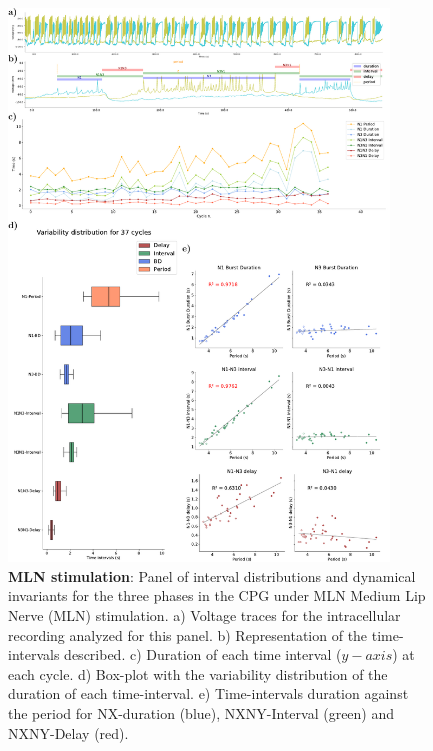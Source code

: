 \begin{figure}[htbp]
	\centering
	\includegraphics[width=0.9\textwidth]{./img/invariants/data/SUSSEX/MLN_driven/images/panel_with_intervals.pdf}
	\caption{\textbf{MLN stimulation}: Panel of interval distributions and dynamical invariants for the three phases in the CPG under MLN Medium Lip Nerve (MLN) stimulation. a) Voltage traces for the intracellular recording analyzed for this panel. b) Representation of the time-intervals described. c) Duration of each time interval ($y-axis$) at each cycle. d) Box-plot with the variability distribution of the duration of each time-interval. e) Time-intervals duration against the period for NX-duration (blue), NXNY-Interval (green) and NXNY-Delay (red).}
	\label{fig:mln stimulation}
\end{figure}


